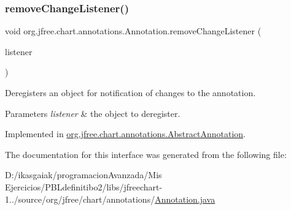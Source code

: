 \subsubsection{\texorpdfstring{remove\+Change\+Listener()}{removeChangeListener()}}
{\footnotesize\ttfamily void org.\+jfree.\+chart.\+annotations.\+Annotation.\+remove\+Change\+Listener (\begin{DoxyParamCaption}\item[{\mbox{\hyperlink{interfaceorg_1_1jfree_1_1chart_1_1event_1_1_annotation_change_listener}{Annotation\+Change\+Listener}}}]{listener }\end{DoxyParamCaption})}

Deregisters an object for notification of changes to the annotation.


\begin{DoxyParams}{Parameters}
{\em listener} & the object to deregister. \\
\hline
\end{DoxyParams}


Implemented in \mbox{\hyperlink{classorg_1_1jfree_1_1chart_1_1annotations_1_1_abstract_annotation_a35d547ca28248732aa2a7935ab41f33e}{org.\+jfree.\+chart.\+annotations.\+Abstract\+Annotation}}.



The documentation for this interface was generated from the following file\+:\begin{DoxyCompactItemize}
\item 
D\+:/ikasgaiak/programacion\+Avanzada/\+Mis Ejercicios/\+P\+B\+Ldefinitibo2/libs/jfreechart-\/1../source/org/jfree/chart/annotations/\mbox{\hyperlink{_annotation_8java}{Annotation.\+java}}\end{DoxyCompactItemize}
